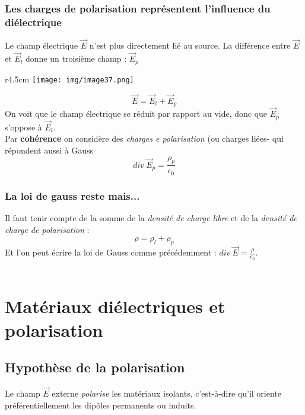 \documentclass[11pt, a4paper, openany]{book}
\begin{document}
		\subsubsection{Les charges de polarisation représentent l'influence du diélectrique}
		
		
		Le champ électrique $\vec{E}$ n'est plus directement lié au source. La différence entre $\vec{E}$ et $\vec{E}_l$ donne un troisième champ : $\vec{E}_p$
		\begin{wrapfigure}[15]{r}{4.5cm}
			\texttt{[image: img/image37.png]}
		\end{wrapfigure}
		\begin{equation}
		\vec{E} = \vec{E}_l + \vec{E}_p
		\end{equation}
		On voit que le champ électrique se réduit par rapport au vide, donc que $\vec{E}_p$ s'oppose à $\vec{E}_l$.\\
		Par \textbf{cohérence} on considère des \textit{charges e polarisation} (ou charges liées- qui répondent aussi à Gauss 
		\begin{equation}
		div\ \vec{E}_p = \frac{\rho_p}{\epsilon_0}
		\end{equation}
		
		\subsubsection{La loi de gauss reste mais...}
		Il faut tenir compte de la somme de la \textit{densité de charge libre} et de la \textit{densité de charge de polarisation} :
		\begin{equation}
		\rho = \rho_l + \rho_p
		\end{equation}
		Et l'on peut écrire la loi de Gauss comme précédemment : $div\ \vec{E} = \frac{\rho}{\epsilon_0}$.\\
		
		\
		
		\section{Matériaux diélectriques et polarisation}
		\subsection{Hypothèse de la polarisation}
		Le champ $\vec{E}$ externe \textit{polarise} les matériaux isolants, c'est-à-dire qu'il oriente préférentiellement les dipôles permanents ou induits.
		
\end{document}
